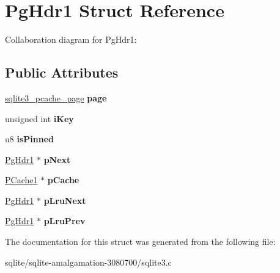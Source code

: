 \hypertarget{struct_pg_hdr1}{\section{Pg\+Hdr1 Struct Reference}
\label{struct_pg_hdr1}
}


Collaboration diagram for Pg\+Hdr1\+:
\subsection*{Public Attributes}
\begin{DoxyCompactItemize}
\item 
\hypertarget{struct_pg_hdr1_a121a9abbfea6b112ba77eeb84391ed47}{\hyperlink{structsqlite3__pcache__page}{sqlite3\+\_\+pcache\+\_\+page} {\bfseries page}}\label{struct_pg_hdr1_a121a9abbfea6b112ba77eeb84391ed47}

\item 
\hypertarget{struct_pg_hdr1_ad122ef74f5f0137414882aabd111a01b}{unsigned int {\bfseries i\+Key}}\label{struct_pg_hdr1_ad122ef74f5f0137414882aabd111a01b}

\item 
\hypertarget{struct_pg_hdr1_a361946b03e1d4664476d9ea3fce490d9}{u8 {\bfseries is\+Pinned}}\label{struct_pg_hdr1_a361946b03e1d4664476d9ea3fce490d9}

\item 
\hypertarget{struct_pg_hdr1_acde43ab0ed0fbba33e526058d9c343b9}{\hyperlink{struct_pg_hdr1}{Pg\+Hdr1} $\ast$ {\bfseries p\+Next}}\label{struct_pg_hdr1_acde43ab0ed0fbba33e526058d9c343b9}

\item 
\hypertarget{struct_pg_hdr1_aa5b23de466773e72e1b6edf07b3a4570}{\hyperlink{struct_p_cache1}{P\+Cache1} $\ast$ {\bfseries p\+Cache}}\label{struct_pg_hdr1_aa5b23de466773e72e1b6edf07b3a4570}

\item 
\hypertarget{struct_pg_hdr1_ae22cfc3a39fe029a8f8fdd70e7ca4055}{\hyperlink{struct_pg_hdr1}{Pg\+Hdr1} $\ast$ {\bfseries p\+Lru\+Next}}\label{struct_pg_hdr1_ae22cfc3a39fe029a8f8fdd70e7ca4055}

\item 
\hypertarget{struct_pg_hdr1_adf220ef63d6ceb782ac87a08aeb1722d}{\hyperlink{struct_pg_hdr1}{Pg\+Hdr1} $\ast$ {\bfseries p\+Lru\+Prev}}\label{struct_pg_hdr1_adf220ef63d6ceb782ac87a08aeb1722d}

\end{DoxyCompactItemize}


The documentation for this struct was generated from the following file\+:\begin{DoxyCompactItemize}
\item 
sqlite/sqlite-\/amalgamation-\/3080700/sqlite3.\+c\end{DoxyCompactItemize}
